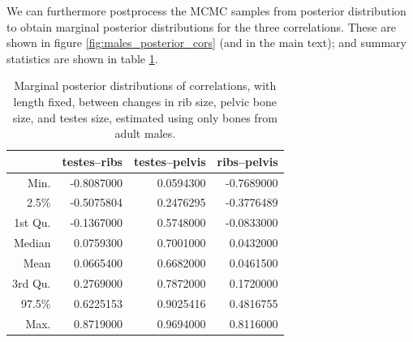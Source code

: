 \documentclass[12pt]{article}
\begin{document}
We can furthermore postprocess the MCMC samples from posterior distribution
to obtain marginal posterior distributions for the three correlations.
These are shown in figure \ref{fig:males_posterior_cors} (and in the main text);
and summary statistics are shown in table \ref{tab:posterior_cors}.




\begin{table}[ht]
\centering
\begin{tabular}{rrrr}
  \hline
        &  testes--ribs & testes--pelvis & ribs--pelvis \\
  \hline
 Min. &     -0.8087000  &   0.0594300 & -0.7689000   \\
 2.5\% &    -0.5075804  &   0.2476295 & -0.3776489   \\
 1st Qu. &  -0.1367000  &   0.5748000 & -0.0833000   \\
 Median &    0.0759300  &   0.7001000 &  0.0432000   \\
 Mean &      0.0665400  &   0.6682000 &  0.0461500   \\
 3rd Qu. &   0.2769000  &   0.7872000 &  0.1720000   \\
 97.5\%  &   0.6225153  &   0.9025416 &  0.4816755   \\
 Max. &      0.8719000  &   0.9694000 &  0.8116000   \\
   \hline
\end{tabular}
  \caption{Marginal posterior distributions of correlations, with length fixed,
  between changes in rib size, pelvic bone size, and testes size,
  estimated using only bones from adult males.
  \label{tab:posterior_cors}
}
\end{table}
\end{document}
